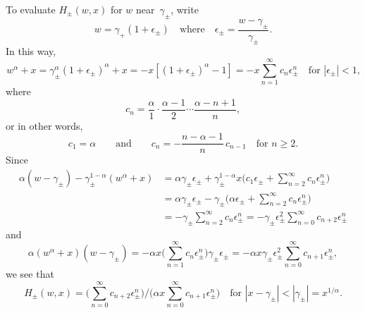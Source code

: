 \documentclass[12pt,a4paper]{article}
\begin{document}
To evaluate $H_\pm(w,x)$ for $w$ near~$\gamma_\pm$, write
\[
w=\gamma_+(1+\epsilon_\pm)\quad\text{where}\quad
\epsilon_\pm=\frac{w-\gamma_\pm}{\gamma_\pm}.
\]
In this way,
\[
w^\alpha+x=\gamma_\pm^\alpha(1+\epsilon_\pm)^\alpha+x
    =-x[(1+\epsilon_\pm)^\alpha-1 ]
    =-x\sum_{n=1}^\infty c_n\epsilon_\pm^n\quad\text{for $|\epsilon_\pm|<1$,}
\]
where
\[
c_n=\frac{\alpha}{1}\cdot\frac{\alpha-1}{2}\cdots\frac{\alpha-n+1}{n},
\]
or in other words,
\[
c_1=\alpha\qquad\text{and}\qquad c_n=-\frac{n-\alpha-1}{n}\,c_{n-1}
\quad\text{for $n\ge2$.}
\]
Since
\begin{align*}
\alpha(w-\gamma_\pm)-\gamma_\pm^{1-\alpha}(w^\alpha+x)
    &=\alpha\gamma_\pm\epsilon_\pm+\gamma_\pm^{1-\alpha}x
        \biggl(c_1\epsilon_\pm+\sum_{n=2}^\infty c_n\epsilon_\pm^n\biggr)\\
    &=\alpha\gamma_\pm\epsilon_\pm-\gamma_\pm
        \biggl(\alpha\epsilon_\pm+\sum_{n=2}^\infty c_n\epsilon_\pm^n\biggr)\\
    &=-\gamma_\pm\sum_{n=2}^\infty c_n\epsilon_\pm^n
    =-\gamma_\pm\epsilon_\pm^2\sum_{n=0}^\infty c_{n+2}\epsilon_\pm^n
\end{align*}
and
\[
\alpha(w^\alpha+x)(w-\gamma_\pm)=-\alpha x\biggl(\sum_{n=1}^\infty 
    c_n\epsilon_\pm^n\biggr)\gamma_\pm\epsilon_\pm
    =-\alpha x\gamma_\pm\epsilon_\pm^2\sum_{n=0}^\infty c_{n+1}\epsilon_\pm^n,
\]
we see that
\[
H_\pm(w,x)=\biggl(\sum_{n=0}^\infty c_{n+2}\epsilon_\pm^n\biggr)\bigg/
    \biggl(\alpha x\sum_{n=0}^\infty c_{n+1}\epsilon_\pm^n\biggr)
    \quad\text{for $|x-\gamma_\pm|<|\gamma_\pm|=x^{1/\alpha}$.}
\]










\printbibliography
\end{document}
